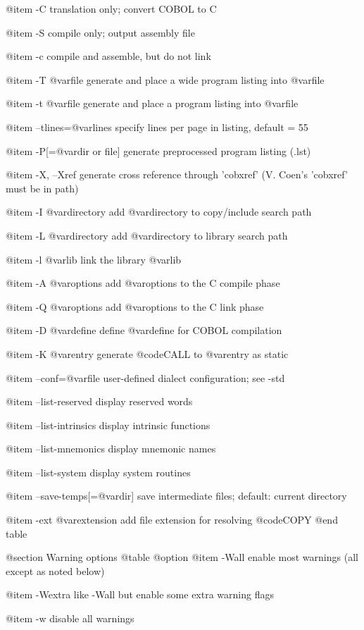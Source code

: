 @item -C
translation only; convert COBOL to C

@item -S
compile only; output assembly file

@item -c
compile and assemble, but do not link

@item -T @var{file}
generate and place a wide program listing into @var{file}

@item -t @var{file}
generate and place a program listing into @var{file}

@item --tlines=@var{lines}
specify lines per page in listing, default = 55

@item -P[=@var{dir or file}]
generate preprocessed program listing (.lst)

@item -X, --Xref
generate cross reference through 'cobxref'
(V. Coen's 'cobxref' must be in path)

@item -I @var{directory}
add @var{directory} to copy/include search path

@item -L @var{directory}
add @var{directory} to library search path

@item -l @var{lib}
link the library @var{lib}

@item -A @var{options}
add @var{options} to the C compile phase

@item -Q @var{options}
add @var{options} to the C link phase

@item -D @var{define}
define @var{define} for COBOL compilation

@item -K @var{entry}
generate @code{CALL} to @var{entry} as static

@item --conf=@var{file}
user-defined dialect configuration; see -std

@item --list-reserved
display reserved words

@item --list-intrinsics
display intrinsic functions

@item --list-mnemonics
display mnemonic names

@item --list-system
display system routines

@item --save-temps[=@var{dir}]
save intermediate files; default: current directory

@item -ext @var{extension}
add file extension for resolving @code{COPY}
@end table

@section Warning options
@table @option
@item -Wall
enable most warnings (all except as noted below)

@item -Wextra
like -Wall but enable some extra warning flags

@item -w
disable all warnings


